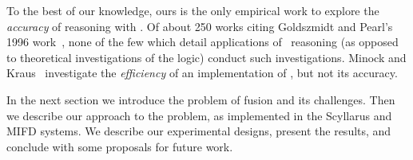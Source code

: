 To the best of our knowledge, ours is the only empirical work to explore the
\emph{accuracy} of reasoning with \zplus.
Of about 250 works citing Goldszmidt and Pearl's 1996
work~\cite{google-scholar-query}, none of the few which detail
applications of \zplus\ reasoning (as opposed to theoretical investigations of
the logic) conduct such investigations.
%
Minock and Kraus~ investigate the
\emph{efficiency} of an implementation of \zplus{},
but not its accuracy.
%
%

In the next section we introduce the problem of \ids fusion
and its challenges.  Then we describe our approach to the
problem, as implemented in the Scyllarus and MIFD systems.  We describe our
experimental designs, present the results, and conclude with some proposals for
future work.

